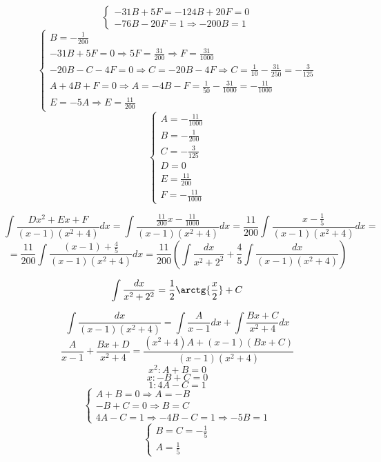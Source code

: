 \documentclass{article}
\begin{document}
	\begin{equation*}
		\begin{cases}
			-31B + 5F = -124B + 20F = 0\\
			-76B - 20F = 1 \Rightarrow -200B = 1
		\end{cases}
	\end{equation*}
	\begin{equation*}
		\begin{cases}
			B = -\frac{1}{200}\\
			-31B + 5F = 0 \Rightarrow 5F = \frac{31}{200} \Rightarrow F = \frac{31}{1000}\\
			-20B - C - 4F = 0 \Rightarrow C = -20B - 4F \Rightarrow C = \frac{1}{10} - \frac{31}{250} = -\frac{3}{125}\\
			A + 4B + F = 0 \Rightarrow A = -4B - F = \frac{1}{50} - \frac{31}{1000} = -\frac{11}{1000}\\
			E = -5A \Rightarrow E = \frac{11}{200}
		\end{cases}
	\end{equation*}
	\begin{equation*}
		\begin{cases}
			A = -\frac{11}{1000}\\
			B = -\frac{1}{200}\\
			C = -\frac{3}{125}\\
			D = 0\\
			E = \frac{11}{200}\\
			F = -\frac{11}{1000}
		\end{cases}
	\end{equation*}

	$$\int\frac{Dx^2 + Ex + F}{(x-1)(x^2+4)}dx = \int\frac{\frac{11}{200}x -\frac{11}{1000}}{(x-1)(x^2+4)}dx = \frac{11}{200}\int\frac{x-\frac{1}{5}}{(x-1)(x^2+4)}dx =$$
	$$= \frac{11}{200}\int\frac{(x - 1) + \frac{4}{5}}{(x-1)(x^2+4)}dx = \frac{11}{200}(\int\frac{dx}{x^2+2^2} + \frac{4}{5}\int\frac{dx}{(x-1)(x^2+4)})$$

	$$\int\frac{dx}{x^2+2^2} = \frac{1}{2}\arctg{\frac{x}{2}} + C$$

	$$\int\frac{dx}{(x - 1)(x^2 + 4)} = \int\frac{A}{x - 1}dx + \int\frac{Bx + C}{x^2 + 4}dx$$
	$$\frac{A}{x - 1} + \frac{Bx + D}{x^2 + 4} = \frac{(x^2+4)A + (x-1)(Bx+C)}{(x-1)(x^2+4)}$$
	$$x^2: A + B = 0$$
	$$x: -B + C = 0$$
	$$1: 4A - C = 1$$
	\begin{equation*}
		\begin{cases}
			A + B = 0 \Rightarrow A = -B\\
			-B + C = 0 \Rightarrow B = C\\
			4A - C = 1 \Rightarrow -4B - C = 1 \Rightarrow -5B = 1
		\end{cases}
	\end{equation*}
	\begin{equation*}
		\begin{cases}
			B = C = -\frac{1}{5}\\
			A = \frac{1}{5}
		\end{cases}
	\end{equation*}
\end{document}
